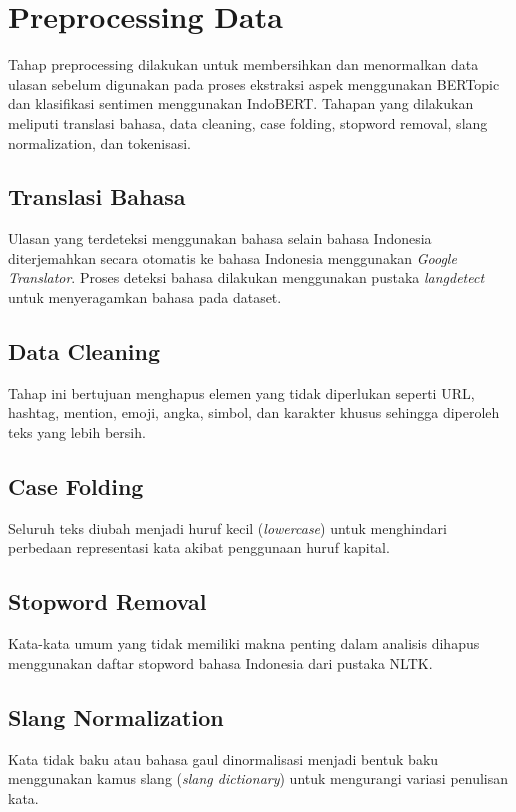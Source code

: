 \section{Preprocessing Data}

Tahap preprocessing dilakukan untuk membersihkan dan menormalkan data ulasan sebelum digunakan pada proses ekstraksi aspek menggunakan BERTopic dan klasifikasi sentimen menggunakan IndoBERT. Tahapan yang dilakukan meliputi translasi bahasa, data cleaning, case folding, stopword removal, slang normalization, dan tokenisasi.

\subsection{Translasi Bahasa}
Ulasan yang terdeteksi menggunakan bahasa selain bahasa Indonesia diterjemahkan secara otomatis ke bahasa Indonesia menggunakan \textit{Google Translator}. Proses deteksi bahasa dilakukan menggunakan pustaka \textit{langdetect} untuk menyeragamkan bahasa pada dataset.

\subsection{Data Cleaning}
Tahap ini bertujuan menghapus elemen yang tidak diperlukan seperti URL, hashtag, mention, emoji, angka, simbol, dan karakter khusus sehingga diperoleh teks yang lebih bersih.

\subsection{Case Folding}
Seluruh teks diubah menjadi huruf kecil (\textit{lowercase}) untuk menghindari perbedaan representasi kata akibat penggunaan huruf kapital.

\subsection{Stopword Removal}
Kata-kata umum yang tidak memiliki makna penting dalam analisis dihapus menggunakan daftar stopword bahasa Indonesia dari pustaka NLTK.

\subsection{Slang Normalization}
Kata tidak baku atau bahasa gaul dinormalisasi menjadi bentuk baku menggunakan kamus slang (\textit{slang dictionary}) untuk mengurangi variasi penulisan kata.


